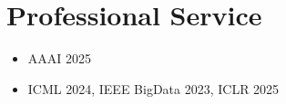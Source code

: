 \section{Professional Service}
\begin{itemize}
      \item {}
            {AAAI 2025}{}
      \item {}
            {ICML 2024, IEEE BigData 2023, ICLR 2025}{}
\end{itemize}